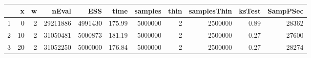 \begin{table}[h]
\centering
\begingroup\tiny
\begin{tabular}{rrrrrrrrrrr}
  \hline
 & x & w & nEval & ESS & time & samples & thin & samplesThin & ksTest & SampPSec \\ 
  \hline
1 & 0 & 2 & 29211886 & 4991430 & 175.99 & 5000000 & 2 & 2500000 & 0.89 & 28362 \\ 
   \hline
2 & 10 & 2 & 31050481 & 5000873 & 181.19 & 5000000 & 2 & 2500000 & 0.27 & 27600 \\ 
   \hline
3 & 20 & 2 & 31052250 & 5000000 & 176.84 & 5000000 & 2 & 2500000 & 0.27 & 28274 \\ 
   \hline
\end{tabular}
\endgroup
\end{table}
